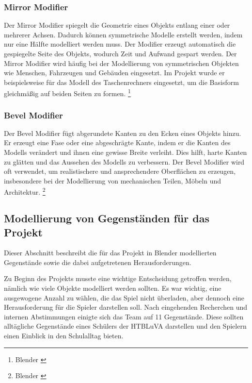 \subsubsection*{Mirror Modifier}
Der Mirror Modifier spiegelt die Geometrie eines Objekts entlang einer oder mehrerer Achsen. Dadurch können symmetrische Modelle erstellt werden, indem nur eine Hälfte modelliert werden muss. Der Modifier erzeugt automatisch die gespiegelte Seite des Objekts, wodurch Zeit und Aufwand gespart werden. Der Mirror Modifier wird häufig bei der Modellierung von symmetrischen Objekten wie Menschen, Fahrzeugen und Gebäuden eingesetzt. Im Projekt wurde er beispielsweise für das Modell des Taschenrechners eingesetzt, um die Basisform gleichmäßig auf beiden Seiten zu formen. \footnote{Blender \cite {Mirror Modifier}}

\subsubsection*{Bevel Modifier}
Der Bevel Modifier fügt abgerundete Kanten zu den Ecken eines Objekts hinzu. Er erzeugt eine Fase oder eine abgeschrägte Kante, indem er die Kanten des Modells verändert und ihnen eine gewisse Breite verleiht. Dies hilft, harte Kanten zu glätten und das Aussehen des Modells zu verbessern. Der Bevel Modifier wird oft verwendet, um realistischere und ansprechendere Oberflächen zu erzeugen, insbesondere bei der Modellierung von mechanischen Teilen, Möbeln und Architektur. \footnote{Blender \cite {Bevel Modifier}}

\subsection{Modellierung von Gegenständen für das Projekt}
Dieser Abschnitt beschreibt die für das Projekt in Blender modellierten Gegenstände sowie die dabei aufgetretenen Herausforderungen.

Zu Beginn des Projekts musste eine wichtige Entscheidung getroffen werden, nämlich wie viele Objekte modelliert werden sollten. Es war wichtig, eine ausgewogene Anzahl zu wählen, die das Spiel nicht überladen, aber dennoch eine Herausforderung für die Spieler darstellen soll. Nach eingehenden Recherchen und internen Abstimmungen einigte sich das Team auf 11 Gegenstände. Diese sollten alltägliche Gegenstände eines Schülers der HTBLuVA darstellen und den Spielern einen Einblick in den Schulalltag bieten.


